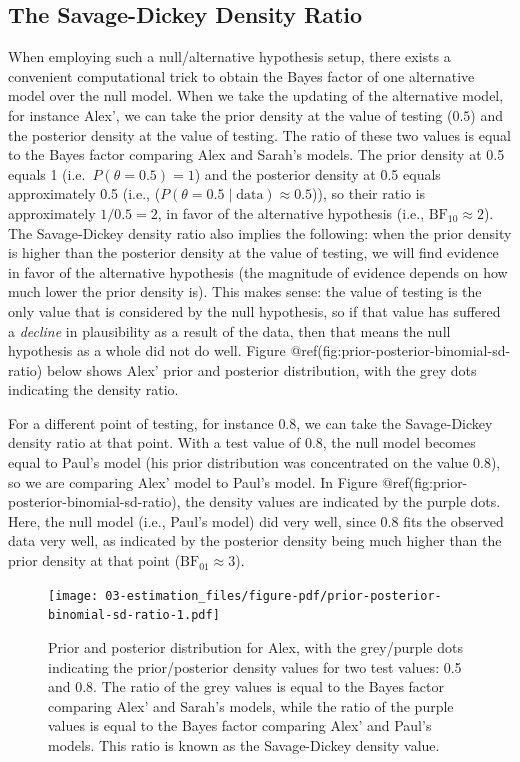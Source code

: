 \documentclass[
  letterpaper,
  DIV=11,
  numbers=noendperiod]{scrreprt}
\begin{document}
\hypertarget{the-savage-dickey-density-ratio}{%
\subsection{The Savage-Dickey Density
Ratio}\label{the-savage-dickey-density-ratio}}

When employing such a null/alternative hypothesis setup, there exists a
convenient computational trick to obtain the Bayes factor of one
alternative model over the null model. When we take the updating of the
alternative model, for instance Alex', we can take the prior density at
the value of testing (\(0.5\)) and the posterior density at the value of
testing. The ratio of these two values is equal to the Bayes factor
comparing Alex and Sarah's models. The prior density at 0.5 equals 1
(i.e.~\(P(\theta = 0.5) = 1\)) and the posterior density at 0.5 equals
approximately 0.5 (i.e.,
(\(P(\theta = 0.5 \mid \text{data}) \approx 0.5\))), so their ratio is
approximately \(1 / 0.5 = 2\), in favor of the alternative hypothesis
(i.e., \(\text{BF}_{10} \approx 2\)). The Savage-Dickey density ratio
also implies the following: when the prior density is higher than the
posterior density at the value of testing, we will find evidence in
favor of the alternative hypothesis (the magnitude of evidence depends
on how much lower the prior density is). This makes sense: the value of
testing is the only value that is considered by the null hypothesis, so
if that value has suffered a \emph{decline} in plausibility as a result
of the data, then that means the null hypothesis as a whole did not do
well. Figure @ref(fig:prior-posterior-binomial-sd-ratio) below shows
Alex' prior and posterior distribution, with the grey dots indicating
the density ratio.

For a different point of testing, for instance \(0.8\), we can take the
Savage-Dickey density ratio at that point. With a test value of 0.8, the
null model becomes equal to Paul's model (his prior distribution was
concentrated on the value 0.8), so we are comparing Alex' model to
Paul's model. In Figure @ref(fig:prior-posterior-binomial-sd-ratio), the
density values are indicated by the purple dots. Here, the null model
(i.e., Paul's model) did very well, since \(0.8\) fits the observed data
very well, as indicated by the posterior density being much higher than
the prior density at that point (\(\text{BF}_{01} \approx 3\)).

\begin{figure}

{\centering \texttt{[image: 03-estimation\_files/figure-pdf/prior-posterior-binomial-sd-ratio-1.pdf]}

}

\caption{Prior and posterior distribution for Alex, with the grey/purple
dots indicating the prior/posterior density values for two test values:
0.5 and 0.8. The ratio of the grey values is equal to the Bayes factor
comparing Alex' and Sarah's models, while the ratio of the purple values
is equal to the Bayes factor comparing Alex' and Paul's models. This
ratio is known as the Savage-Dickey density value.}

\end{figure}
\end{document}
